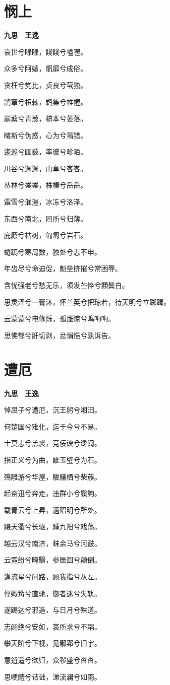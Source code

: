 \documentclass[12pt,a4paper]{ctexbook}
\begin{document}
\section{悯上}
\textbf{九思　王逸}\par\vspace{0.5em}
哀世兮睩睩，諓諓兮嗌喔。\par
众多兮阿媚，骪靡兮成俗。\par
贪枉兮党比，贞良兮茕独。\par
鹄窜兮枳棘，鹈集兮帷幄。\par
罽蕠兮青葱，槁本兮萎落。\par
睹斯兮伪惑，心为兮隔错。\par
逡巡兮圃薮，率彼兮畛陌。\par
川谷兮渊渊，山阜兮峉峉。\par
丛林兮崟崟，株榛兮岳岳。\par
霜雪兮漼溰，冰冻兮洛泽。\par
东西兮南北，罔所兮归薄。\par
庇廕兮枯树，匍匐兮岩石。\par
蜷跼兮寒局数，独处兮志不申。\par
年齿尽兮命迫促，魁垒挤摧兮常困辱。\par
含忧强老兮愁无乐，须发苎悴兮顠鬓白。\par
思灵泽兮一膏沐，怀兰英兮把琼若，待天明兮立踯躅。\par
云蒙蒙兮电鯈烁，孤雌惊兮鸣呴呴。\par
思怫郁兮肝切剥，忿悁悒兮孰诉告。\par

\section{遭厄}
\textbf{九思　王逸}\par\vspace{0.5em}
悼屈子兮遭厄，沉王躬兮湘汨。\par
何楚国兮难化，迄于今兮不易。\par
士莫志兮羔裘，竞佞谀兮谗阋。\par
指正义兮为曲，訿玉璧兮为石。\par
殦雕游兮华屋，鵔鸃栖兮柴蔟。\par
起奋迅兮奔走，违群小兮謑訽。\par
载青云兮上昇，適昭明兮所处。\par
蹑天衢兮长驱，踵九阳兮戏荡。\par
越云汉兮南济，秣余马兮河鼓。\par
云霓纷兮晻翳，参辰回兮颠倒。\par
逢流星兮问路，顾我指兮从左。\par
俓娵觜兮直驰，御者迷兮失轨。\par
遂踢达兮邪造，与日月兮殊道。\par
志阏绝兮安如，哀所求兮不耦。\par
攀天阶兮下视，见鄢郢兮旧宇。\par
意逍遥兮欲归，众秽盛兮沓沓。\par
思哽饐兮诘诎，涕流澜兮如雨。\par
\end{document}
